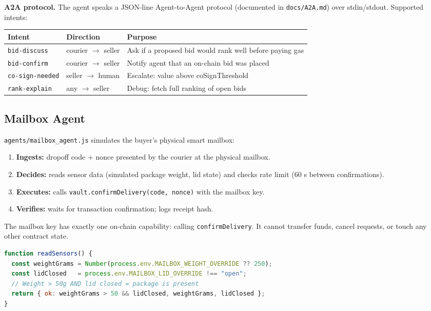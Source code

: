 \documentclass[12pt,a4paper]{article}
\begin{document}
\textbf{A2A protocol.} The agent speaks a JSON-line Agent-to-Agent protocol (documented in \texttt{docs/A2A.md}) over stdin/stdout. Supported intents:

\begin{center}
\begin{tabular}{lll}
\toprule
Intent & Direction & Purpose \\
\midrule
\texttt{bid-discuss}    & courier $\to$ seller & Ask if a proposed bid would rank well before paying gas \\
\texttt{bid-confirm}    & courier $\to$ seller & Notify agent that an on-chain bid was placed \\
\texttt{co-sign-needed} & seller $\to$ human   & Escalate: value above coSignThreshold \\
\texttt{rank-explain}   & any $\to$ seller     & Debug: fetch full ranking of open bids \\
\bottomrule
\end{tabular}
\end{center}

\subsection{Mailbox Agent}

\texttt{agents/mailbox\_agent.js} simulates the buyer's physical smart mailbox:

\begin{enumerate}
    \item \textbf{Ingests:} dropoff code + nonce presented by the courier at the physical mailbox.
    \item \textbf{Decides:} reads sensor data (simulated package weight, lid state) and checks rate limit (60 s between confirmations).
    \item \textbf{Executes:} calls \texttt{vault.confirmDelivery(code, nonce)} with the mailbox key.
    \item \textbf{Verifies:} waits for transaction confirmation; logs receipt hash.
\end{enumerate}

The mailbox key has exactly one on-chain capability: calling \texttt{confirmDelivery}. It cannot transfer funds, cancel requests, or touch any other contract state.

\begin{lstlisting}[language=JavaScript, caption=Sensor check in mailbox\_agent.js]
function readSensors() {
  const weightGrams = Number(process.env.MAILBOX_WEIGHT_OVERRIDE ?? 250);
  const lidClosed   = process.env.MAILBOX_LID_OVERRIDE !== "open";
  // Weight > 50g AND lid closed = package is present
  return { ok: weightGrams > 50 && lidClosed, weightGrams, lidClosed };
}
\end{lstlisting}
\end{document}
